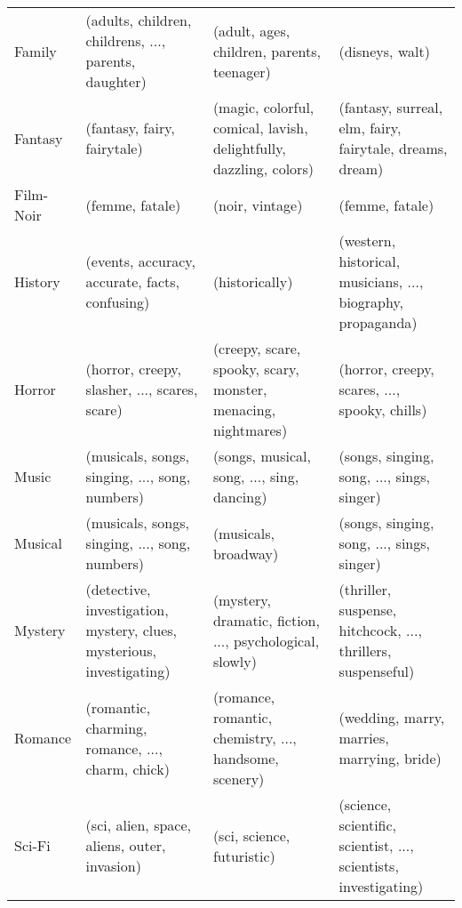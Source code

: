 \begin{landscape}
\begin{table}[]
\begin{tabular}{lp{7cm}p{7cm}p{7cm}}
			Family      & (adults, children, childrens, ..., parents, daughter)                        & (adult, ages, children, parents, teenager)                         & (disneys, walt)                                                          \\
			Fantasy     & (fantasy, fairy, fairytale)                                                  & (magic, colorful, comical, lavish, delightfully, dazzling, colors) & (fantasy, surreal, elm, fairy, fairytale, dreams, dream)                 \\
			Film-Noir   & (femme, fatale)                                                              & (noir, vintage)                                                    & (femme, fatale)                                                          \\
			History     & (events, accuracy, accurate, facts, confusing)                               & (historically)                                                     & (western, historical, musicians, ..., biography, propaganda)             \\
			Horror      & (horror, creepy, slasher, ..., scares, scare)                                & (creepy, scare, spooky, scary, monster, menacing, nightmares)      & (horror, creepy, scares, ..., spooky, chills)                            \\
			Music       & (musicals, songs, singing, ..., song, numbers)                               & (songs, musical, song, ..., sing, dancing)                         & (songs, singing, song, ..., sings, singer)                               \\
			Musical     & (musicals, songs, singing, ..., song, numbers)                               & (musicals, broadway)                                               & (songs, singing, song, ..., sings, singer)                               \\
			Mystery     & (detective, investigation, mystery, clues, mysterious, investigating)        & (mystery, dramatic, fiction, ..., psychological, slowly)           & (thriller, suspense, hitchcock, ..., thrillers, suspenseful)             \\
			Romance     & (romantic, charming, romance, ..., charm, chick)                             & (romance, romantic, chemistry, ..., handsome, scenery)             & (wedding, marry, marries, marrying, bride)                               \\
			Sci-Fi      & (sci, alien, space, aliens, outer, invasion)                                 & (sci, science, futuristic)                                         & (science, scientific, scientist, ..., scientists, investigating)         \\

\end{tabular}
\end{table}
\end{landscape}
